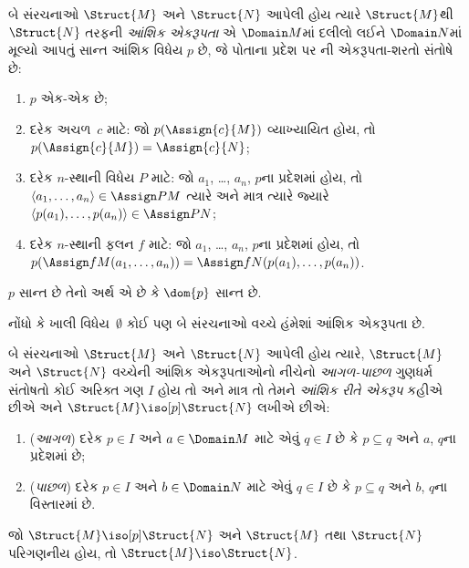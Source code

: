 \begin{defn}
  બે સંરચનાઓ $\Struct{M}$ અને $\Struct{N}$ આપેલી હોય ત્યારે
  $\Struct{M}$થી $\Struct{N}$ તરફની \emph{આંશિક એકરૂપતા} એ
  $\Domain M$માં દલીલો લઈને $\Domain N$માં મૂલ્યો આપતું સાન્ત આંશિક
  વિધેય $p$ છે, જે પોતાના પ્રદેશ પર
  ની એકરૂપતા-શરતો સંતોષે છે:
  \begin{enumerate}
  \item $p$ એક-એક છે;
  \item દરેક અચળ~$c$ માટે: જો $p(\Assign{c}{M})$
    વ્યાખ્યાયિત હોય, તો $p(\Assign{c}{M}) = \Assign{c}{N}$;
  \item દરેક $n$-સ્થાની વિધેય $P$ માટે: જો $a_1$, \dots,
    $a_n$, $p$ના પ્રદેશમાં હોય, તો $\langle a_1, \dots, a_n\rangle
    \in \Assign P M$ ત્યારે અને માત્ર ત્યારે જ્યારે
    $\langle p(a_1), \dots, p(a_n) \rangle \in \Assign P N$;
  \item દરેક $n$-સ્થાની ફલન $f$ માટે: જો $a_1$, \dots,
    $a_n$, $p$ના પ્રદેશમાં હોય, તો $p(\Assign f M (a_1, \dots,a_n))
    = \Assign f N (p(a_1), \dots, p(a_n))$.
  \end{enumerate}
  $p$ સાન્ત છે તેનો અર્થ એ છે કે $\dom{p}$ સાન્ત છે.
\end{defn}

નોંધો કે ખાલી વિધેય~$\emptyset$ કોઈ પણ બે સંરચનાઓ વચ્ચે હંમેશાં
આંશિક એકરૂપતા છે.

\begin{defn}
  બે સંરચનાઓ $\Struct{M}$ અને $\Struct{N}$ આપેલી હોય ત્યારે,
  $\Struct{M}$ અને $\Struct{N}$ વચ્ચેની આંશિક એકરૂપતાઓનો નીચેનો
  \emph{આગળ-પાછળ} ગુણધર્મ સંતોષતો કોઈ અરિક્ત ગણ $I$ હોય તો અને માત્ર
  તો તેમને \emph{આંશિક રીતે એકરૂપ} કહીએ છીએ અને
  $\Struct{M} \iso[p] \Struct{N}$ લખીએ છીએ:
  \begin{enumerate}
  \item (\emph{આગળ}) દરેક $p \in I$ અને $a \in \Domain M$ માટે એવું
    $q \in I$ છે કે $p \subseteq q$ અને $a$, $q$ના પ્રદેશમાં છે;
  \item (\emph{પાછળ}) દરેક $p \in I$ અને $b \in \Domain N$ માટે એવું
    $q \in I$ છે કે $p \subseteq q$ અને $b$, $q$ના વિસ્તારમાં છે.
  \end{enumerate}
\end{defn}

\begin{thm}
  જો $\Struct{M} \iso[p] \Struct{N}$ અને $\Struct{M}$ તથા
  $\Struct{N}$ પરિગણનીય હોય, તો $\Struct{M} \iso \Struct{N}$.
\end{thm}

